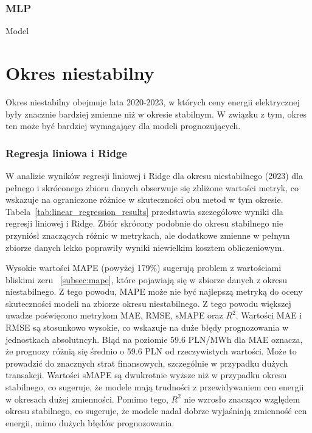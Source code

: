 \subsubsection{MLP}

Model

\section{Okres niestabilny}
\label{sec:okres_niestabilny}

Okres niestabilny obejmuje lata 2020-2023, w których ceny energii elektrycznej były znacznie bardziej zmienne niż w okresie stabilnym. W związku z tym, okres ten może być bardziej wymagający dla modeli prognozujących.

\subsubsection{Regresja liniowa i Ridge}

W analizie wyników regresji liniowej i Ridge dla okresu niestabilnego (2023) dla pełnego i skróconego zbioru danych obserwuje się zbliżone wartości metryk, co wskazuje na ograniczone różnice w skuteczności obu metod w tym okresie. Tabela~\ref{tab:linear_regression_results} przedstawia szczegółowe wyniki dla regresji liniowej i Ridge. Zbiór skrócony podobnie do okresu stabilnego nie przyniósł znaczących różnic w metrykach, ale dodatkowe zmienne w pełnym zbiorze danych lekko poprawiły wyniki niewielkim kosztem obliczeniowym. 

Wysokie wartości MAPE (powyżej 179\%) sugerują problem z wartościami bliskimi zeru ~\ref{subsec:mape}, które pojawiają się w zbiorze danych z okresu niestabilnego. Z tego powodu, MAPE może nie być najlepszą metryką do oceny skuteczności modeli na zbiorze okresu niestabilnego. Z tego powodu większej uwadze poświęcono metrykom MAE, RMSE, sMAPE oraz \(R^2\). Wartości MAE i RMSE są stosunkowo wysokie, co wskazuje na duże błędy prognozowania w jednostkach absolutncyh. Błąd na poziomie 59.6 PLN/MWh dla MAE oznacza, że prognozy różnią się średnio o 59.6 PLN od rzeczywistych wartości. Może to prowadzić do znacznych strat finansowych, szczególnie w przypadku dużych transakcji. Wartości sMAPE są dwukrotnie wyższe niż w przypadku okresu stabilnego, co sugeruje, że modele mają trudności z przewidywaniem cen energii w okresach dużej zmienności. Pomimo tego, \(R^2\) nie wzrosło znacząco względem okresu stabilnego, co sugeruje, że modele nadal dobrze wyjaśniają zmienność cen energii, mimo dużych błędów prognozowania. 

